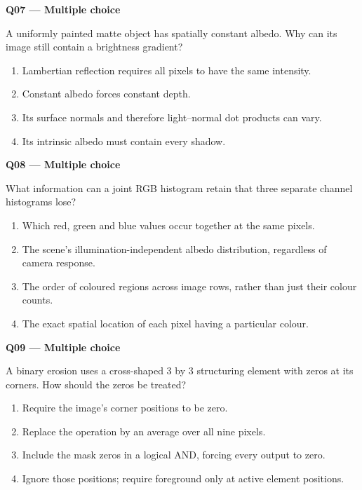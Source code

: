 \documentclass[11pt,a4paper]{article}
\begin{document}
\par\vspace{12pt}
\begin{minipage}{\linewidth}
\textbf{Q07 — Multiple choice}\par\smallskip
A uniformly painted matte object has spatially constant albedo. Why can its image still contain a brightness gradient?
\begin{enumerate}[label=\textbf{\Alph*.}]
\item Lambertian reflection requires all pixels to have the same intensity.
\item Constant albedo forces constant depth.
\item Its surface normals and therefore light–normal dot products can vary.
\item Its intrinsic albedo must contain every shadow.
\end{enumerate}
\end{minipage}
\par\vspace{12pt}
\begin{minipage}{\linewidth}
\textbf{Q08 — Multiple choice}\par\smallskip
What information can a joint RGB histogram retain that three separate channel histograms lose?
\begin{enumerate}[label=\textbf{\Alph*.}]
\item Which red,\allowbreak{} green and blue values occur together at the same pixels.
\item The scene's illumination-independent albedo distribution,\allowbreak{} regardless of camera response.
\item The order of coloured regions across image rows,\allowbreak{} rather than just their colour counts.
\item The exact spatial location of each pixel having a particular colour.
\end{enumerate}
\end{minipage}
\par\vspace{12pt}
\begin{minipage}{\linewidth}
\textbf{Q09 — Multiple choice}\par\smallskip
A binary erosion uses a cross-shaped 3 by 3 structuring element with zeros at its corners. How should the zeros be treated?
\begin{enumerate}[label=\textbf{\Alph*.}]
\item Require the image's corner positions to be zero.
\item Replace the operation by an average over all nine pixels.
\item Include the mask zeros in a logical AND,\allowbreak{} forcing every output to zero.
\item Ignore those positions; require foreground only at active element positions.
\end{enumerate}
\end{minipage}
\end{document}
